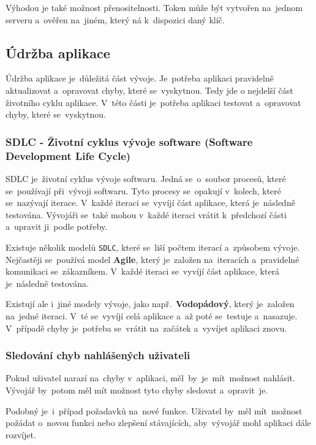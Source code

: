 \documentclass[14pt]{article}
\begin{document}
            Výhodou je také možnost přenositelnosti. Token může být vytvořen na~jednom serveru a~ověřen na~jiném, který ná k~dispozici daný klíč.\parencite{ieee:jwt}

        \subsection{Údržba aplikace}
        Údržba aplikace je~důležitá část vývoje. Je~potřeba aplikaci pravidelně aktualizovat a~opravovat chyby, které se~vyskytnou.
        Tedy jde o nejdelší část životního cyklu aplikace. V~této části je~potřeba aplikaci testovat a~opravovat chyby, které se~vyskytnou.
        
            \subsubsection{SDLC - Životní cyklus vývoje software (Software Development Life Cycle)}
            SDLC je~životní cyklus vývoje softwaru. Jedná se~o~soubor procesů, které se~používají při~vývoji softwaru.
            Tyto procesy se~opakují v~kolech, které se~nazývají iterace. V~každé iteraci se~vyvíjí část aplikace, která je~následně testována.
            Vývojáři se~také mohou v~každé iteraci vrátit k~předchozí části a~upravit ji~podle potřeby.

            Existuje několik modelů \texttt{SDLC}, které se~liší počtem iterací a~způsobem vývoje. Nejčastěji se~používá model \textbf{Agile},
            který je~založen na~iteracích a~pravidelné komunikaci se~zákazníkem. V~každé iteraci se~vyvíjí část aplikace, která je~následně testována.

            Existují ale i~jiné modely vývoje, jako např.~\textbf{Vodopádový}, který je~založen na~jedné iteraci.
            V~té se~vyvíjí celá aplikace a~až poté se~testuje a~nasazuje.
            V~případě chyby je~potřeba se~vrátit na~začátek a~vyvíjet aplikaci znovu.

            \subsubsection{Sledování chyb nahlášených uživateli}
            Pokud uživatel narazí na~chyby v~aplikaci, měl~by~je~mít~možnost nahlásit. Vývojář by~potom měl mít možnost tyto chyby sledovat a~opravit~je.

            Podobný je~i~případ požadavků na~nové funkce. Uživatel by~měl mít~možnost požádat o~novou funkci nebo zlepšení stávajících,
            aby~vývojář mohl aplikaci dále rozvíjet.
\end{document}
